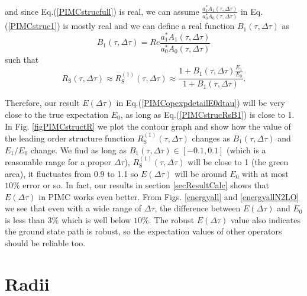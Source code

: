 \documentclass[12pt,letterpaper,UTF8]{report}
\begin{document}
and since Eq.(\ref{PIMCstrucfull}) is real, we can assume $\frac{a_1^* A_1(\tau,\Delta \tau) }{a_0^* A_0(\tau,\Delta \tau) }$ in Eq.(\ref{PIMCstruc1}) is mostly real and we can define a real function $B_1(\tau,\Delta \tau)$ as
\begin{equation}
B_1(\tau,\Delta \tau) = Re \frac{a_1^* A_1(\tau,\Delta \tau) }{a_0^* A_0(\tau,\Delta \tau) }
\label{PIMCstrucB1}
\end{equation}
such that
\begin{equation}
R_{\text{S}}(\tau,\Delta \tau) \approx
R^{(1)}_{\text{S}}(\tau,\Delta \tau) \approx
\frac{ 1+B_1(\tau,\Delta \tau) \frac{E_1}{E_0} }{1+B_1(\tau,\Delta \tau)}.
\label{PIMCstrucRsB1}
\end{equation}

Therefore, our result $E(\Delta \tau)$ in Eq.(\ref{PIMCopexpdetailE0dtau}) will be very close to the true expectation $E_0$,
as long as Eq.(\ref{PIMCstrucRsB1}) is close to 1.
In Fig. \ref{figPIMCstructR} we plot the contour graph and show how the value of the leading order structure function $R^{(1)}_{\text{S}}(\tau,\Delta \tau)$ changes as $B_1(\tau,\Delta \tau)$ and $E_1/E_0$ change.
We find as long as $B_1(\tau,\Delta \tau) \in [-0.1,0.1]$ (which is a reasonable range for a proper $\Delta \tau$),
$R^{(1)}_{\text{S}}(\tau,\Delta \tau) $ will be close to 1 (the green area),
it fluctuates from 0.9 to 1.1 so $E(\Delta \tau)$ will be around $E_0$ with at most $10\%$ error or so.
In fact, our results in section \ref{secResultCalc} shows that $E(\Delta \tau)$ in PIMC works even better.
From Figs. \ref{energyall} and \ref{energyallN2LO} we see that even with a wide range of $\Delta \tau$, the difference between $E(\Delta \tau)$ and $E_0$ is less than $3\%$ which is well below $10\%$.
The robust $E(\Delta \tau)$ value also indicates the ground state path is robust, so the expectation values of other operators should be reliable too.




\section{Radii}
\end{document}
